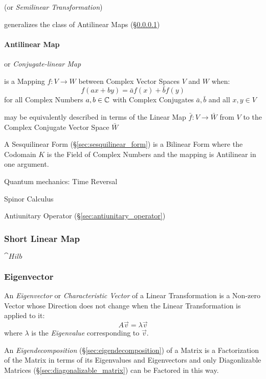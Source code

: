 (or \emph{Semilinear Transformation})

generalizes the class of Antilinear Maps (\S\ref{sec:antilinear_map})



\paragraph{Antilinear Map}\label{sec:antilinear_map}\hfill

or \emph{Conjugate-linear Map}

is a Mapping $f : V \rightarrow W$ between Complex Vector Spaces $V$ and $W$
when:
\[
  f (ax+by) = \bar{a}f(x) + \bar{b}f(y)
\]
for all Complex Numbers $a,b \in \mathbb{C}$ with Complex Conjugates $\bar{a},
\bar{b}$ and all $x,y \in V$

may be equivalently described in terms of the Linear Map $\bar{f} : V
\rightarrow \bar{W}$ from $V$ to the Complex Conjugate Vector Space $\bar{W}$

A Sesquilinear Form (\S\ref{sec:sesquilinear_form}) is a Bilinear Form where
the Codomain $K$ is the Field of Complex Numbers and the mapping is Antilinear
in one argument.


Quantum mechanics: Time Reversal

Spinor Calculus

\fist Antiunitary Operator (\S\ref{sec:antiunitary_operator})



\subsubsection{Short Linear Map}\label{sec:short_linear}

$\cat{Hilb}$



\subsubsection{Eigenvector}\label{sec:eigenvector}

An \emph{Eigenvector} or \emph{Characteristic Vector} of a Linear
Transformation is a Non-zero Vector whose Direction does not change when the
Linear Transformation is applied to it:
\[
  A\vec{v} = \lambda\vec{v}
\]
where $\lambda$ is the \emph{Eigenvalue} corresponding to $\vec{v}$.

An \emph{Eigendecomposition} (\S\ref{sec:eigendecomposition}) of a Matrix is a
Factorization of the Matrix in terms of its Eigenvalues and Eigenvectors and
only Diagonlizable Matrices (\S\ref{sec:diagonalizable_matrix}) can be Factored
in this way.

